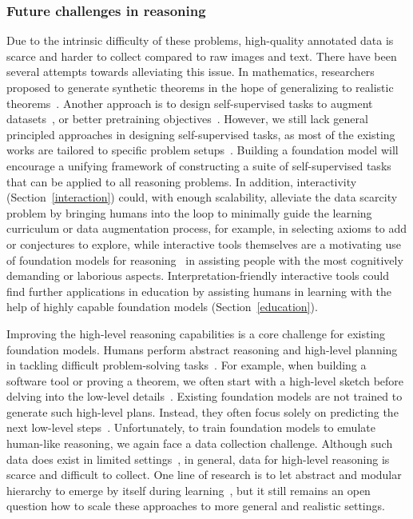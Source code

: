 \subsubsection{Future challenges in reasoning} Due to the intrinsic difficulty of these problems, high-quality annotated data is scarce and harder to collect compared to raw images and text. There have been several attempts towards alleviating this issue. In mathematics, researchers proposed to generate synthetic theorems in the hope of generalizing to realistic theorems~\citep{DBLP:conf/nips/WangD20,wu2021int,vlad2021mathai,refactor}. Another approach is to design self-supervised tasks to augment datasets~\citep{yasunaga2020repair,ren2020query2box,pact,DBLP:journals/corr/abs-2102-07492,yasunaga2021break}, or better pretraining objectives~\citep{lime}. However, we still lack general principled approaches in designing self-supervised tasks, as most of the existing works are tailored to specific problem setups~\citep{yasunaga2020repair,ren2020beta,pact}. Building a foundation model will encourage a unifying framework of constructing a suite of self-supervised tasks that can be applied to all reasoning problems. In addition, interactivity (Section~\ref{interaction}) could, with enough scalability, alleviate the data scarcity problem by bringing humans into the loop to minimally guide the learning curriculum or data augmentation process, for example, in selecting axioms to add or conjectures to explore, while interactive tools themselves are a motivating use of foundation models for reasoning~\citep{pact,chen2021evaluating} in assisting people with the most cognitively demanding or laborious aspects. Interpretation-friendly interactive tools could find further applications in education by assisting humans in learning with the help of highly capable foundation models (Section~\ref{education}). 

Improving the high-level reasoning capabilities is a core challenge for existing foundation models. Humans perform abstract reasoning and high-level planning in tackling difficult problem-solving tasks~\citep{MillerGalanterPribram60}. For example, when building a software tool or proving a theorem, we often start with a high-level sketch before delving into the low-level details~\cite{KOEDINGER1990511}. Existing foundation models are not trained to generate such high-level plans. Instead, they often focus solely on predicting the next low-level steps~\citep{DBLP:journals/corr/polu2020generative, pact, chen2021evaluating}. Unfortunately, to train foundation models to emulate human-like reasoning, we again face a data collection challenge. Although such data does exist in limited settings~\citep{li2021isarstep}, in general, data for high-level reasoning is scarce and difficult to collect. One line of research is to let abstract and modular hierarchy to emerge by itself during learning~\citep{DBLP:conf/pldi/EllisWNSMHCST21,hong21latent}, but it still remains an open question how to scale these approaches to more general and realistic settings. 

